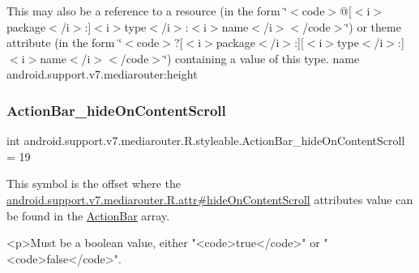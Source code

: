 This may also be a reference to a resource (in the form \char`\"{}$<$code$>$@\mbox{[}$<$i$>$package$<$/i$>$\+:\mbox{]}$<$i$>$type$<$/i$>$\+:$<$i$>$name$<$/i$>$$<$/code$>$\char`\"{}) or theme attribute (in the form \char`\"{}$<$code$>$?\mbox{[}$<$i$>$package$<$/i$>$\+:\mbox{]}\mbox{[}$<$i$>$type$<$/i$>$\+:\mbox{]}$<$i$>$name$<$/i$>$$<$/code$>$\char`\"{}) containing a value of this type.  name android.\+support.\+v7.\+mediarouter\+:height \mbox{\label{classandroid_1_1support_1_1v7_1_1mediarouter_1_1R_1_1styleable_acda53a948ac9d1be56e1645847c13e3f}} 
\subsubsection{\texorpdfstring{Action\+Bar\+\_\+hide\+On\+Content\+Scroll}{ActionBar\_hideOnContentScroll}}
{\footnotesize\ttfamily int android.\+support.\+v7.\+mediarouter.\+R.\+styleable.\+Action\+Bar\+\_\+hide\+On\+Content\+Scroll = 19\hspace{0.3cm}{\ttfamily [static]}}

This symbol is the offset where the \hyperlink{classandroid_1_1support_1_1v7_1_1mediarouter_1_1R_1_1attr_a3648c455c32e39588f76f8d24b3a6400}{android.\+support.\+v7.\+mediarouter.\+R.\+attr\#hide\+On\+Content\+Scroll} attribute\textquotesingle{}s value can be found in the \hyperlink{classandroid_1_1support_1_1v7_1_1mediarouter_1_1R_1_1styleable_adc4d3c0d096085367f12d025007aa53f}{Action\+Bar} array.

\begin{DoxyVerb}      <p>Must be a boolean value, either "<code>true</code>" or "<code>false</code>".
\end{DoxyVerb}
 

